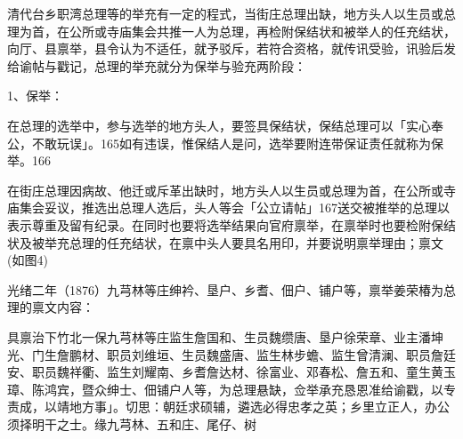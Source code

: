 \vfill
\begin{BookNotes}
\end{BookNotes}


清代台乡职湾总理等的举充有一定的程式，当街庄总理出缺，地方头人以生员或总理为首，在公所或寺庙集会共推一人为总理，再检附保结状和被举人的任充结状，向厅、县禀举，县令认为不适任，就予驳斥，若符合资格，就传讯受验，讯验后发给谕帖与戳记，总理的举充就分为保举与验充两阶段：

1、保举：

在总理的选举中，参与选举的地方头人，要签具保结状，保结总理可以「实心奉公，不敢玩误」。165如有违误，惟保结人是问，选举要附连带保证责任就称为保举。166


\begin{BookQuote}
在街庄总理因病故、他迁或斥革出缺时，地方头人以生员或总理为首，在公所或寺庙集会妥议，推选出总理人选后，头人等会「公立请帖」167送交被推举的总理以表示尊重及留有纪录。在同时也要将选举结果向官府禀举，在禀举时也要检附保结状及被举充总理的任充结状，在禀中头人要具名用印，并要说明禀举理由；禀文(如图4)
\end{BookQuote}

光绪二年（1876）九芎林等庄绅衿、垦户、乡耆、佃户、铺户等，禀举姜荣椿为总理的禀文内容：

\begin{BookQuote}
具禀治下竹北一保九芎林等庄监生詹国和、生员魏缵唐、垦户徐荣章、业主潘坤光、门生詹鹏材、职员刘维垣、生员魏盛唐、监生林步蟾、监生曾清澜、职员詹廷安、职员魏祥衢、监生刘耀南、乡耆詹达材、徐富业、邓春松、詹五和、童生黄玉璋、陈鸿宾，暨众绅士、佃铺户人等，为总理悬缺，佥举承充恳恩准给谕戳，以专责成，以靖地方事」。切思：朝廷求硕辅，遴选必得忠孝之英；乡里立正人，办公须择明干之士。缘九芎林、五和庄、尾仔、树
\end{BookQuote}

\vfill
\begin{BookNotes}
\end{BookNotes}


